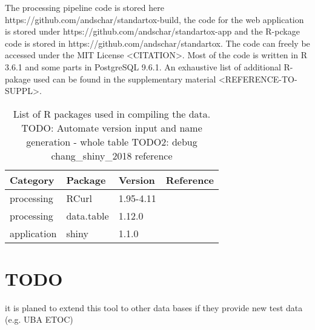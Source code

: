 The processing pipeline code is stored here https://github.com/andschar/standartox-build, the code for the web application is stored under https://github.com/andschar/standartox-app and the R-pckage code is stored in https://github.com/andschar/standartox. The code can freely be accessed under the MIT License <CITATION>. Most of the code is written in R 3.6.1 and some parts in PostgreSQL 9.6.1. An exhaustive list of additional R-pakage used can be found in the supplementary material <REFERENCE-TO-SUPPL>.

\begin{table}[h!]
    \centering
    \begin{tabular}{|l|l|l|l|}
        \hline
        Category        & Package       & Version   & Reference                     \\ \hline
        processing      & RCurl         & 1.95-4.11 & \citep{lang_rcurl_2018}       \\ \hline
        processing      & data.table    & 1.12.0    & \citep{dowle_data.table_2018} \\ \hline
        application     & shiny         & 1.1.0     & \citep{chang_shiny_2018}      \\ \hline
    \end{tabular}
    \caption{List of R packages used in compiling the data.\newline{}
    TODO: Automate version input and name generation - whole table\newline{}
    TODO2: debug chang\_shiny\_2018 reference}
    \label{tab:rpackages}
\end{table}


\section{TODO}

    \item it is planed to extend this tool to other data bases if they provide new test data  (e.g. UBA ETOC)